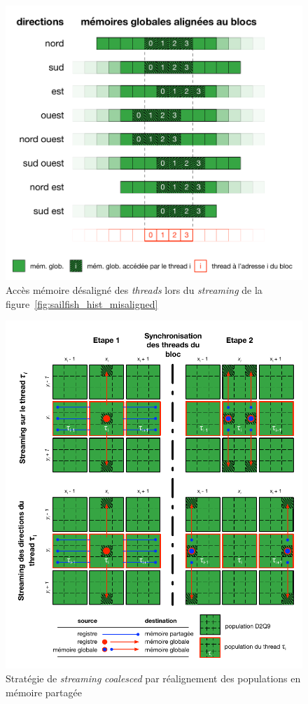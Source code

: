 \begin{figure}[H]
	\centering
	\includegraphics[fbox,scale=0.95]{images/streaming/sailfish_hist_dir_misaligned.pdf}
	\caption{Accès mémoire désaligné des \textit{threads} lors du \textit{streaming} de la figure~\ref{fig:sailfish_hist_misaligned}}
	\label{fig:sailfish_hist_dir_misaligned}
\end{figure}

\begin{figure}[H]
	\centering
	\includegraphics[fbox,scale=1.1]{images/streaming/sailfish_hist_ti.pdf}
	\caption{Stratégie de \textit{streaming} \textit{coalesced} par réalignement des populations en mémoire partagée}
	\label{fig:sailfish_hist_ti}
\end{figure}
\pagebreak

